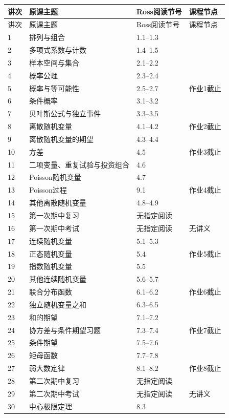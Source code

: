 \begin{longtable}{@{}p{.07\linewidth}p{.44\linewidth}p{.20\linewidth}p{.19\linewidth}@{}}
\toprule
讲次 & 原课主题 & Ross阅读节号 & 课程节点\\\midrule
\endfirsthead
\toprule 讲次 & 原课主题 & Ross阅读节号 & 课程节点\\\midrule
\endhead
1 & 排列与组合 & 1.1--1.3 & \\
2 & 多项式系数与计数 & 1.4--1.5 & \\
3 & 样本空间与集合 & 2.1--2.2 & \\
4 & 概率公理 & 2.3--2.4 & \\
5 & 概率与等可能性 & 2.5--2.7 & 作业1截止\\
6 & 条件概率 & 3.1--3.2 & \\
7 & 贝叶斯公式与独立事件 & 3.3--3.5 & \\
8 & 离散随机变量 & 4.1--4.2 & 作业2截止\\
9 & 离散随机变量的期望 & 4.3--4.4 & \\
10 & 方差 & 4.5 & 作业3截止\\
11 & 二项变量、重复试验与投资组合 & 4.6 & \\
12 & Poisson随机变量 & 4.7 & \\
13 & Poisson过程 & 9.1 & 作业4截止\\
14 & 其他离散随机变量 & 4.8--4.9 & \\
15 & 第一次期中复习 & 无指定阅读 & \\
16 & 第一次期中考试 & 无指定阅读 & 无讲义\\
17 & 连续随机变量 & 5.1--5.3 & \\
18 & 正态随机变量 & 5.4 & 作业5截止\\
19 & 指数随机变量 & 5.5 & \\
20 & 其他连续随机变量 & 5.6--5.7 & \\
21 & 联合分布函数 & 6.1--6.2 & 作业6截止\\
22 & 独立随机变量之和 & 6.3--6.5 & \\
23 & 和的期望 & 7.1--7.2 & \\
24 & 协方差与条件期望习题 & 7.3--7.4 & 作业7截止\\
25 & 条件期望 & 7.5--7.6 & \\
26 & 矩母函数 & 7.7--7.8 & \\
27 & 弱大数定律 & 8.1--8.2 & 作业8截止\\
28 & 第二次期中复习 & 无指定阅读 & \\
29 & 第二次期中考试 & 无指定阅读 & 无讲义\\
30 & 中心极限定理 & 8.3 & \\

\end{longtable}
